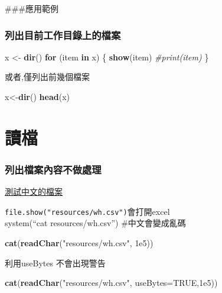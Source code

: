 \documentclass[]{book}
\newenvironment{Shaded}{\begin{snugshade}}{\end{snugshade}}
\newcommand{\CommentTok}[1]{\textcolor[rgb]{0.56,0.35,0.01}{\textit{#1}}}
\newcommand{\ControlFlowTok}[1]{\textcolor[rgb]{0.13,0.29,0.53}{\textbf{#1}}}
\newcommand{\DataTypeTok}[1]{\textcolor[rgb]{0.13,0.29,0.53}{#1}}
\newcommand{\FloatTok}[1]{\textcolor[rgb]{0.00,0.00,0.81}{#1}}
\newcommand{\KeywordTok}[1]{\textcolor[rgb]{0.13,0.29,0.53}{\textbf{#1}}}
\newcommand{\NormalTok}[1]{#1}
\newcommand{\OtherTok}[1]{\textcolor[rgb]{0.56,0.35,0.01}{#1}}
\newcommand{\StringTok}[1]{\textcolor[rgb]{0.31,0.60,0.02}{#1}}
\theoremstyle{definition}
\theoremstyle{definition}
\theoremstyle{definition}
\theoremstyle{remark}
\begin{document}
\#\#\#應用範例

\subsubsection{列出目前工作目錄上的檔案}

\begin{Shaded}
\begin{Highlighting}[]
\NormalTok{x <-}\StringTok{ }\KeywordTok{dir}\NormalTok{()}
\ControlFlowTok{for}\NormalTok{ (item }\ControlFlowTok{in}\NormalTok{ x) \{}
    \KeywordTok{show}\NormalTok{(item) }\CommentTok{#print(item)}
\NormalTok{\}}
\end{Highlighting}
\end{Shaded}

或者,僅列出前幾個檔案

\begin{Shaded}
\begin{Highlighting}[]
\NormalTok{x<-}\KeywordTok{dir}\NormalTok{()}
\KeywordTok{head}\NormalTok{(x)}
\end{Highlighting}
\end{Shaded}

\section{讀檔}

\subsubsection{列出檔案內容不做處理}

\href{resources/hw_chinese.csv}{測試中文的檔案}

\texttt{file.show("resources/wh.csv")}會打開excel\\
system(``cat resources/wh.csv'') \#中文會變成亂碼

\begin{Shaded}
\begin{Highlighting}[]
\KeywordTok{cat}\NormalTok{(}\KeywordTok{readChar}\NormalTok{(}\StringTok{"resources/wh.csv"}\NormalTok{, }\FloatTok{1e5}\NormalTok{))}
\end{Highlighting}
\end{Shaded}

利用useBytes 不會出現警告

\begin{Shaded}
\begin{Highlighting}[]
\KeywordTok{cat}\NormalTok{(}\KeywordTok{readChar}\NormalTok{(}\StringTok{"resources/wh.csv"}\NormalTok{, }\DataTypeTok{useBytes=}\OtherTok{TRUE}\NormalTok{,}\FloatTok{1e5}\NormalTok{))  }
\end{Highlighting}
\end{Shaded}
\end{document}
